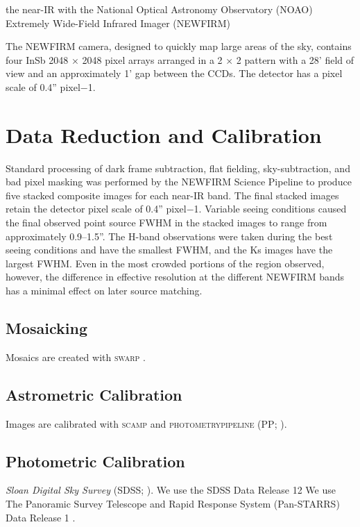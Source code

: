 \documentclass[apj, revtex4]{emulateapj}
\begin{document}
the near-IR with the National Optical Astronomy
Observatory (NOAO) Extremely Wide-Field Infrared Imager
(NEWFIRM)

The
NEWFIRM camera, designed to quickly map large areas of the
sky, contains four InSb 2048 × 2048 pixel arrays arranged in a
2 × 2 pattern with a 28' field of view and an approximately
1' gap between the CCDs. The detector has a pixel scale of
0.4'' pixel−1. \citep{Probst2004}

\section{Data Reduction and Calibration}\label{sec:data reduction}
Standard processing of dark frame subtraction, flat fielding,
sky-subtraction, and bad pixel masking was performed by
the NEWFIRM Science Pipeline \citep{Swaters2009} to produce five stacked composite images
for each near-IR band. The final stacked images retain the
detector pixel scale of 0.4'' pixel−1. Variable seeing conditions
caused the final observed point source FWHM in the stacked
images to range from approximately 0.9–1.5''. The H-band
observations were taken during the best seeing conditions and
have the smallest FWHM, and the Ks images have the largest
FWHM. Even in the most crowded portions of the region
observed, however, the difference in effective resolution at the
different NEWFIRM bands has a minimal effect on later source matching.

\subsection{Mosaicking}
Mosaics are created with \textsc{swarp} \citep{Bertin2002}.

\subsection{Astrometric Calibration}
Images are calibrated with \textsc{scamp} \citep{Bertin2006} and \textsc{photometrypipeline} (PP; \citealt{Mommert2017}).

\subsection{Photometric Calibration}
\textit{Sloan Digital Sky Survey} (SDSS; \citealt{York2000}).
We use the SDSS Data Release 12 \citep{Alam2015}
We use The Panoramic Survey Telescope and Rapid Response System (Pan-STARRS) Data Release 1 \citep{Chambers2016, Flewelling2016}.
\end{document}
